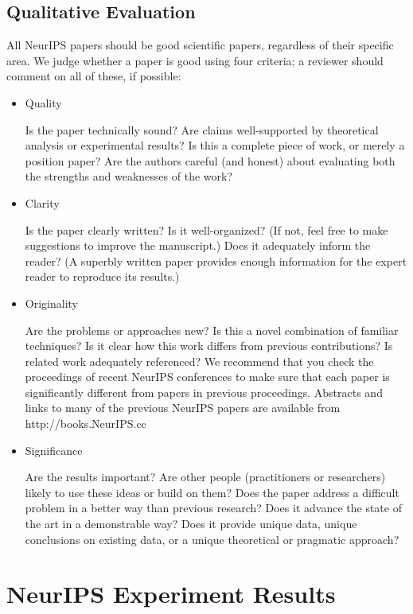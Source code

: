 \subsection*{Qualitative Evaluation}\label{qualitative-evaluation}

All NeurIPS papers should be good scientific papers, regardless of their
specific area. We judge whether a paper is good using four criteria; a
reviewer should comment on all of these, if possible:

\begin{itemize}
\item
  Quality

  Is the paper technically sound? Are claims well-supported by
  theoretical analysis or experimental results? Is this a complete piece
  of work, or merely a position paper? Are the authors careful (and
  honest) about evaluating both the strengths and weaknesses of the
  work?
\item
  Clarity

  Is the paper clearly written? Is it well-organized? (If not, feel free
  to make suggestions to improve the manuscript.) Does it adequately
  inform the reader? (A superbly written paper provides enough
  information for the expert reader to reproduce its results.)
\item
  Originality

  Are the problems or approaches new? Is this a novel combination of
  familiar techniques? Is it clear how this work differs from previous
  contributions? Is related work adequately referenced? We recommend
  that you check the proceedings of recent NeurIPS conferences to make sure
  that each paper is significantly different from papers in previous
  proceedings. Abstracts and links to many of the previous NeurIPS papers
  are available from http://books.NeurIPS.cc
\item
  Significance
  
  Are the results important? Are other people (practitioners or
  researchers) likely to use these ideas or build on them? Does the paper
  address a difficult problem in a better way than previous research? Does
  it advance the state of the art in a demonstrable way? Does it provide
  unique data, unique conclusions on existing data, or a unique
  theoretical or pragmatic approach?
\end{itemize}


\section{NeurIPS Experiment Results}
\label{app:neurips-experiment-results}

